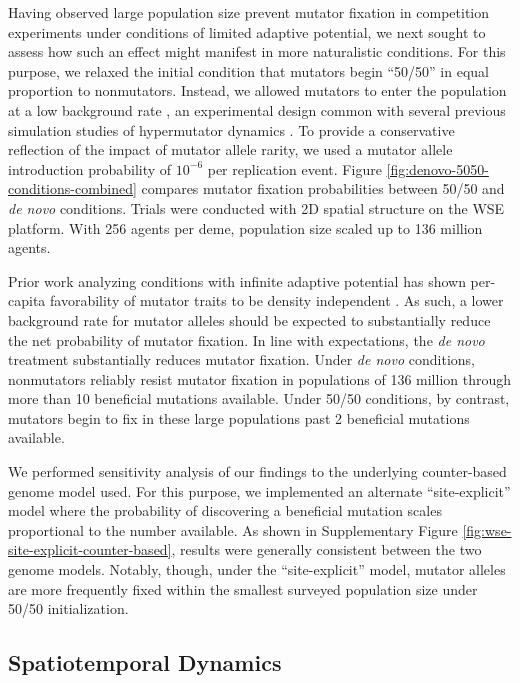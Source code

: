 Having observed large population size prevent mutator fixation in competition experiments under conditions of limited adaptive potential, we next sought to assess how such an effect might manifest in more naturalistic conditions.
For this purpose, we relaxed the initial condition that mutators begin ``50/50'' in equal proportion to nonmutators.
Instead, we allowed mutators to enter the population at a low background rate \citep{desai2011balance,johnson1999approach}, an experimental design common with several previous simulation studies of hypermutator dynamics \citep{wylie2009fixation,tenaillon1999mutators}.
To provide a conservative reflection of the impact of mutator allele rarity, we used a mutator allele introduction probability of $10^{-6}$ per replication event.
Figure \ref{fig:denovo-5050-conditions-combined} compares mutator fixation probabilities between 50/50 and \textit{de novo} conditions.
Trials were conducted with 2D spatial structure on the WSE platform.
With 256 agents per deme, population size scaled up to 136 million agents.

Prior work analyzing conditions with infinite adaptive potential has shown per-capita favorability of mutator traits to be density independent \citep{raynes2019selection}.
As such, a lower background rate for mutator alleles should be expected to substantially reduce the net probability of mutator fixation.
In line with expectations, the \textit{de novo} treatment substantially reduces mutator fixation.
Under \textit{de novo} conditions, nonmutators reliably resist mutator fixation in populations of 136 million through more than 10 beneficial mutations available.
Under 50/50 conditions, by contrast, mutators begin to fix in these large populations past 2 beneficial mutations available.

We performed sensitivity analysis of our findings to the underlying counter-based genome model used.
For this purpose, we implemented an alternate ``site-explicit'' model where the probability of discovering a beneficial mutation scales proportional to the number available.
As shown in Supplementary Figure \ref{fig:wse-site-explicit-counter-based}, results were generally consistent between the two genome models.
Notably, though, under the ``site-explicit'' model, mutator alleles are more frequently fixed within the smallest surveyed population size under 50/50 initialization.

\subsection{Spatiotemporal Dynamics}
\label{sec:dynamics}

